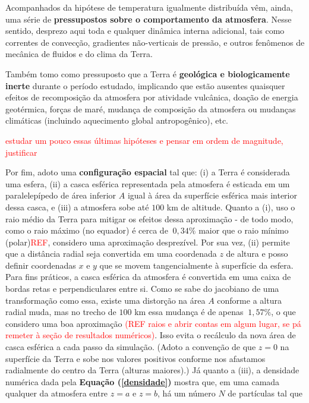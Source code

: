 \documentclass[12pt]{extarticle} %
\begin{document}
\par Acompanhados da hipótese de temperatura igualmente distribuída vêm, ainda, uma série de \textbf{pressupostos sobre o comportamento da atmosfera}. Nesse sentido, desprezo aqui toda e qualquer dinâmica interna adicional, tais como correntes de convecção, gradientes não-verticais de pressão, e outros fenômenos de mecânica de fluidos e do clima da Terra.

\par Também tomo como pressuposto que a Terra é \textbf{geológica e biologicamente inerte} durante o período estudado, implicando que estão ausentes quaisquer efeitos de recomposição da atmosfera por atividade vulcânica, doação de energia geotérmica, forças de maré, mudança de composição da atmosfera ou mudanças climáticas (incluindo aquecimento global antropogênico), etc.

\textcolor{red}{estudar um pouco essas últimas hipóteses e pensar em ordem de magnitude, justificar}

\par Por fim, adoto uma \textbf{configuração espacial} tal que: (i) a Terra é considerada uma esfera, (ii) a casca esférica representada pela atmosfera é esticada em um paralelepípedo de área inferior $A$ igual à área da superfície esférica mais interior dessa casca, e (iii) a atmosfera sobe até $100$ km de altitude. Quanto a (i), uso o raio médio da Terra para mitigar os efeitos dessa aproximação - de todo modo, como o raio máximo (no equador) é cerca de $~0,34\%$ maior que o raio mínimo (polar)\textcolor{red}{REF}, considero uma aproximação desprezível. Por sua vez, (ii) permite que a distância radial seja convertida em uma coordenada $z$ de altura e posso definir coordenadas $x$ e $y$ que se movem tangencialmente à superfície da esfera. Para fins práticos, a casca esférica da atmosfera é convertida em uma caixa de bordas retas e perpendiculares entre si. Como se sabe do jacobiano de uma transformação como essa, existe uma distorção na área $A$ conforme a altura radial muda, mas no trecho de $100$ km essa mudança é de apenas $~1,57\%$, o que considero uma boa aproximação \textcolor{red}{(REF raios e abrir contas em algum lugar, se pá remeter à seção de resultados numéricos)}. Isso evita o recálculo da nova área de casca esférica a cada passo da simulação. (Adoto a convenção de que $z=0$ na superfície da Terra e sobe nos valores positivos conforme nos afastamos radialmente do centro da Terra (alturas maiores).) Já quanto a (iii), a densidade numérica dada pela \textbf{Equação (\ref{densidade})} mostra que, em uma camada qualquer da atmosfera entre $z=a$ e $z=b$, há um número $N$ de partículas tal que
\end{document}
